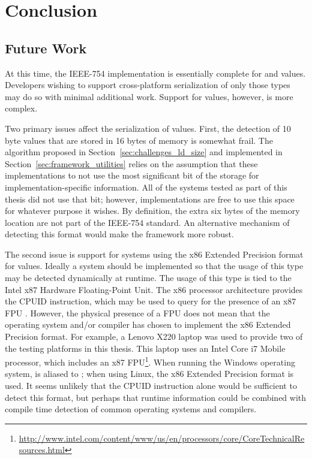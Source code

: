 \chapter{Conclusion}
\label{chap:conclusion}

\section{Future Work}
At this time, the IEEE-754 implementation is essentially complete for  and  values. Developers wishing to support cross-platform serialization of only those types may do so with minimal additional work. Support for  values, however, is more complex.

Two primary issues affect the serialization of  values. First, the detection of 10 byte  values that are stored in 16 bytes of memory is somewhat frail. The algorithm proposed in Section~\ref{sec:challenges_ld_size} and implemented in Section~\ref{sec:framework_utilities} relies on the assumption that these implementations to not use the most significant bit of the storage for implementation-specific information. All of the systems tested as part of this thesis did not use that bit; however, implementations are free to use this space for whatever purpose it wishes. By definition, the extra six bytes of the memory location are not part of the IEEE-754 standard. An alternative mechanism of detecting this format would make the framework more robust.

The second issue is support for systems using the x86 Extended Precision format for  values. Ideally a system should be implemented so that the usage of this type may be detected dynamically at runtime. The usage of this type is tied to the Intel x87 Hardware Floating-Point Unit. The x86 processor architecture provides the CPUID instruction, which may be used to query for the presence of an x87 FPU \cite{AMD:CPUID}. However, the physical presence of a FPU does not mean that the operating system and/or compiler has chosen to implement the x86 Extended Precision format. For example, a Lenovo X220 laptop was used to provide two of the testing platforms in this thesis. This laptop uses an Intel Core i7 Mobile processor, which includes an x87 FPU\footnote{\url{http://www.intel.com/content/www/us/en/processors/core/CoreTechnicalResources.html}}. When running the Windows operating system,  is aliased to ; when using Linux, the x86 Extended Precision format is used. It seems unlikely that the CPUID instruction alone would be sufficient to detect this format, but perhaps that runtime information could be combined with compile time detection of common operating systems and compilers.

